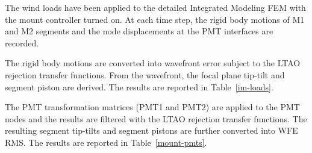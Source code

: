 \documentclass{gmto-book}
\begin{document}
The wind loads have been applied to the detailed Integrated Modeling FEM with
the mount controller turned on.
At each time step, the rigid body motions of M1 and M2 segments and the node
displacements at the PMT interfaces are recorded.

The rigid body motions are converted into wavefront error subject to the LTAO
rejection transfer functions.
From the wavefront, the focal plane tip-tilt and segment piston are derived.
The results are reported in Table~\ref{im-loads}.

The PMT transformation matrices (PMT1 and PMT2) are applied to the PMT nodes and
the results are filtered with the LTAO rejection transfer functions.
The resulting segment tip-tilts and segment pistons are further converted into
WFE RMS.
The results are reported in Table~\ref{mount-pmts}.
\end{document}
